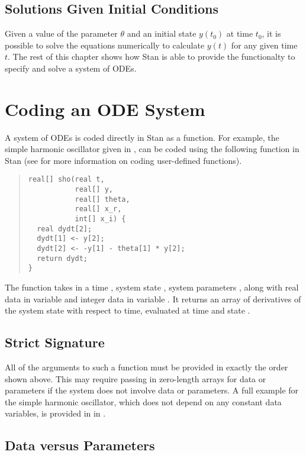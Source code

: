 \subsection{Solutions Given Initial Conditions}

Given a value of the parameter $\theta$ and an initial state $y(t_0)$
at time $t_0$, it is possible to solve the equations numerically to
calculate $y(t)$ for any given time $t$.  The rest of this chapter
shows how Stan is able to provide the functionalty to specify and
solve a system of ODEs.



\section{Coding an ODE System}

A system of ODEs is coded directly in Stan as a function.  For
example, the simple harmonic oscillator given in
, can be coded using the following function in
Stan (see  for more information on
coding user-defined functions).
%
\begin{quote}
\begin{Verbatim}
real[] sho(real t,
           real[] y, 
           real[] theta,
           real[] x_r,
           int[] x_i) {
  real dydt[2];
  dydt[1] <- y[2];
  dydt[2] <- -y[1] - theta[1] * y[2];
  return dydt;
}
\end{Verbatim}
\end{quote}
%
The function takes in a time , system state , system
parameters , along with real data in variable
 and integer data in variable .  It
returns an array of derivatives of the system state with respect to
time, evaluated at time  and state .

\subsection{Strict Signature}

All of the arguments to such a function must be provided in exactly
the order shown above.  This may require passing in zero-length
arrays for data or parameters if the system does not involve data or
parameters.  A full example for the simple harmonic oscillator, which
does not depend on any constant data variables, is provided in
in .

\subsection{Data versus Parameters}

